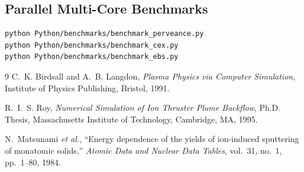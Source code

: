 \documentclass[11pt,a4paper]{article}
\begin{document}
\subsection{Parallel Multi-Core Benchmarks}
\begin{lstlisting}[language=bash]
python Python/benchmarks/benchmark_perveance.py
python Python/benchmarks/benchmark_cex.py
python Python/benchmarks/benchmark_ebs.py
\end{lstlisting}

\begin{thebibliography}{9}
C.~K. Birdsall and A.~B. Langdon,
\textit{Plasma Physics via Computer Simulation},
Institute of Physics Publishing, Bristol, 1991.

R.~I.~S. Roy, \textit{Numerical Simulation of Ion Thruster Plume Backflow}, Ph.D. Thesis, Massachusetts Institute of Technology, Cambridge, MA, 1995.

N.~Matsunami \textit{et al.},
``Energy dependence of the yields of ion-induced sputtering of monatomic solids,'' \textit{Atomic Data and Nuclear Data Tables}, vol.~31, no.~1, pp.~1--80, 1984.
\end{thebibliography}
\end{document}
